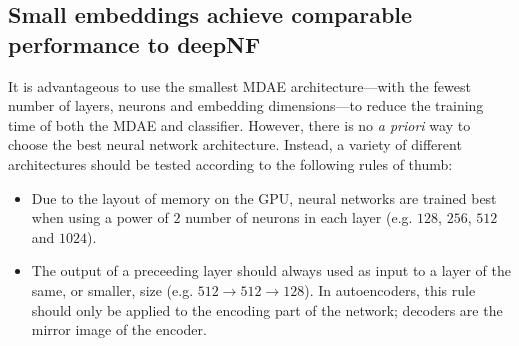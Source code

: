 \subsection{Small embeddings achieve comparable performance to deepNF}
\label{sec:experiment-with-different-mda-architectures}



It is advantageous to use the smallest MDAE architecture---with the fewest number of layers, neurons and embedding dimensions---to reduce the training time of both the MDAE and classifier.
However, there is no \emph{a priori} way to choose the best neural network architecture.
Instead, a variety of different architectures should be tested according to
the following rules of thumb:

\begin{itemize}
    \item Due to the layout of memory on the GPU, neural networks are trained best when using a power of $2$ number of neurons in each layer (e.g. $128$, $256$, $512$ and $1024$).
    \item The output of a preceeding layer should always used as input to a layer of the same, or smaller, size (e.g. $512 \rightarrow 512 \rightarrow 128$). In autoencoders, this rule should only be applied to the encoding part of the network; decoders are the mirror image of the encoder.
\end{itemize}

%



